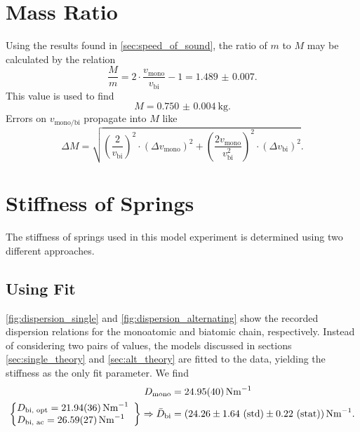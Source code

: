 \section{Mass Ratio}
Using the results found in \autoref{sec:speed_of_sound}, the ratio of $m$ to $M$ may be calculated by the relation
\begin{equation*}
	\frac{M}{m} = 2\cdot\frac{v_\text{mono}}{v_\text{bi}} -1 = \num{1.489(7)}.
\end{equation*}
This value is used to find
\begin{equation*}
	M = \SI{0.750(4)}{\kg}.
\end{equation*}
Errors on $v_\text{mono/bi}$ propagate into $M$ like
\begin{equation*}
	\Delta M = \sqrt{ \left(\frac{2}{v_\text{bi}}\right)^2 \cdot (\Delta v_\text{mono})^2 + \left(\frac{2v_\text{mono}}{v_\text{bi}^2}\right)^2 \cdot (\Delta v_\text{bi})^2 }.
\end{equation*}

\section{Stiffness of Springs}
The stiffness of springs used in this model experiment is determined using two different approaches.

\subsection{Using Fit}
\autoref{fig:dispersion_single} and \autoref{fig:dispersion_alternating} show the recorded dispersion relations for the monoatomic and biatomic chain, respectively.
Instead of considering two pairs of values, the models discussed in sections \ref{sec:single_theory} and \ref{sec:alt_theory} are fitted to the data, yielding the stiffness as the only fit parameter.
We find
\begin{align*}
	D_\text{mono} &= \SI{24.95(40)}{\newton\meter^{-1}} \\
	\left\{ \begin{array}{@{}ll@{}}
		D_\text{bi, opt} = \SI{21.94(36)}{\newton\meter^{-1}} \\
		D_\text{bi, ac} = \SI{26.59(27)}{\newton\meter^{-1}}
	\end{array}\right\} \Rightarrow \bar{D}_\text{bi} &= \left(\num{24.26}\pm \num{1.64}\ \text{(std)}\pm \num{0.22}\ \text{(stat)}\right)\si{\newton\meter^{-1}}.
\end{align*}

